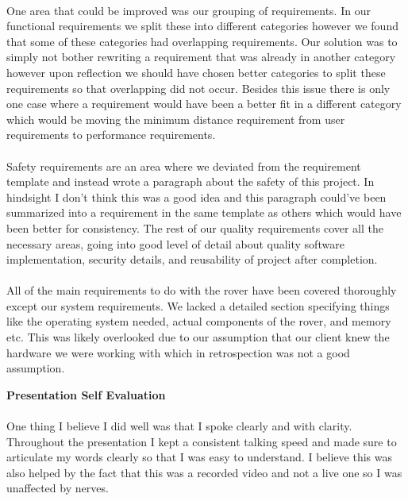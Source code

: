 \documentclass[11pt, a4paper]{article}
\begin{document}
	\paragraph{} {One area that could be improved was our grouping of requirements. In our functional requirements we split these into different categories however we found that some of these categories had overlapping requirements. Our solution was to simply not bother rewriting a requirement that was already in another category however upon reflection we should have chosen better categories to split these requirements so that overlapping did not occur. Besides this issue there is only one case where a requirement would have been a better fit in a different category which would be moving the minimum distance requirement from user requirements to performance requirements. }
	\paragraph{} {Safety requirements are an area where we deviated from the requirement template and instead wrote a paragraph about the safety of this project. In hindsight I don’t think this was a good idea and this paragraph could’ve been summarized into a requirement in the same template as others which would have been better for consistency. The rest of our quality requirements cover all the necessary areas, going into good level of detail about quality software implementation, security details, and reusability of project after completion.}
	\paragraph{} {All of the main requirements to do with the rover have been covered thoroughly except our system requirements. We lacked a detailed section specifying things like the operating system needed, actual components of the rover, and memory etc. This was likely overlooked due to our assumption that our client knew the hardware we were working with which in retrospection was not a good assumption. }
	
	
	\newpage
	\begin{center}
	\huge \bf Presentation Self Evaluation
	\end{center}
	\paragraph{} {One thing I believe I did well was that I spoke clearly and with clarity. Throughout the presentation I kept a consistent talking speed and made sure to articulate my words clearly so that I was easy to understand. I believe this was also helped by the fact that this was a recorded video and not a live one so I was unaffected by nerves. }
	
\end{document}

